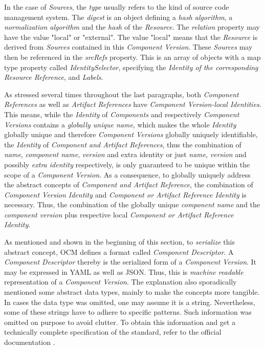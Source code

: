 In the case of \emph{Sources}, the \emph{type} usually refers to the kind of source code management system. The \emph{digest} is an object defining a \emph{hash algorithm}, a \emph{normalization algorithm} and the \emph{hash} of the \emph{Resource}. The \emph{relation} property may have the value "local" or "external". The value "local" means that the \emph{Resource} is derived from \emph{Sources} contained in this \emph{Component Version}. These \emph{Sources} may then be referenced in the \emph{srcRefs} property. This is an array of objects with a map type property called \emph{IdentitySelector}, specifying the \emph{Identity of the corresponding Resource Reference}, and \emph{Labels}.\par
As stressed several times throughout the last paragraphs, both \emph{Component References} as well as \emph{Artifact References} have \emph{Component Version-local Identities}. This means, while the \emph{Identity} of \emph{Components} and respectively \emph{Component Versions} contains a \emph{globally unique name}, which makes the whole \emph{Identity} globally unique and therefore \emph{Component Versions} globally uniquely identifiable, the \emph{Identity} of \emph{Component and Artifact References}, thus the combination of \emph{name}, \emph{component name}, \emph{version} and {extra identity} or just \emph{name}, \emph{version} and possibly \emph{extra identity} respectively, is only guaranteed to be unique within the scope of a \emph{Component Version}. As a consequence, to globally uniquely address the abstract concepts of \emph{Component and Artifact Reference}, the combination of \emph{Component Version Identity} and \emph{Component or Artifact Reference Identity} is necessary. Thus, the combination of the globally unique \emph{component name} and the \emph{component version} plus respective local \emph{Component or Artifact Reference Identity}.\par
\noindent As mentioned and shown in the beginning of this section, to \emph{serialize} this abstract concept, OCM defines a format called \emph{Component Descriptor}. A \emph{Component Descriptor} thereby is the serialized form of a \emph{Component Version}. It may be expressed in YAML as well as JSON. Thus, this is \emph{machine readable} representation of a \emph{Component Version}. The explanation also sporadically mentioned some abstract data types, mainly to make the concepts more tangible. In cases the data type was omitted, one may assume it is a string. Nevertheless, some of these strings have to adhere to specific patterns. Such information was omitted on purpose to avoid clutter. To obtain this information and get a technically complete specification of the standard, refer to the official documentation \cite{OCMSpec}.


